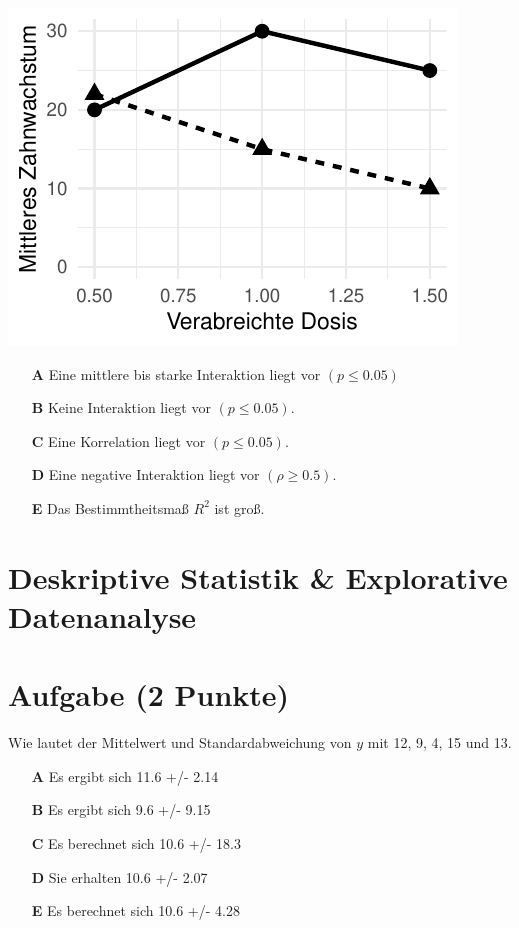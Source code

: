 \documentclass[a4paper, 9pt]{scrartcl}\usepackage[]{graphicx}\usepackage[]{xcolor}
\makeatletter
\def\maxwidth{ %
  \ifdim\Gin@nat@width>\linewidth
    \linewidth
  \else
    \Gin@nat@width
  \fi
}
\makeatother
\begin{document}
{\centering \includegraphics[width=\maxwidth]{img/mc-anova-02-a-1} 

}







\begin{enumerate}
\item [\textbf{A} \msquare] Eine mittlere bis starke Interaktion liegt vor $(p \leq 0.05)$
\item [\textbf{B} \msquare] Keine Interaktion liegt vor $(p \leq 0.05)$.
\item [\textbf{C} \msquare] Eine Korrelation liegt vor $(p \leq 0.05)$.
\item [\textbf{D} \msquare] Eine negative Interaktion liegt vor $(\rho \geq 0.5)$.
\item [\textbf{E} \msquare] Das Bestimmtheitsmaß $R^2$ ist groß.
\end{enumerate} 
\section*{Deskriptive Statistik \& Explorative Datenanalyse}

\section{Aufgabe \hfill (2 Punkte)}




Wie lautet der Mittelwert und Standardabweichung von $y$ mit 12, 9, 4, 15 und 13.



\begin{enumerate}
\item [\textbf{A} \msquare] Es ergibt sich 11.6 +/- 2.14
\item [\textbf{B} \msquare] Es ergibt sich 9.6 +/- 9.15
\item [\textbf{C} \msquare] Es berechnet sich 10.6 +/- 18.3
\item [\textbf{D} \msquare] Sie erhalten 10.6 +/- 2.07
\item [\textbf{E} \msquare] Es berechnet sich 10.6 +/- 4.28
\end{enumerate} 
\end{document}
